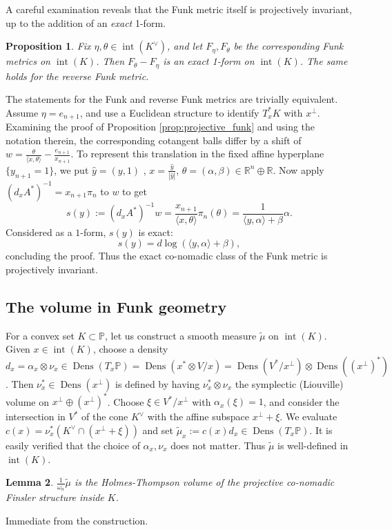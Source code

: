 \documentclass[reqno,10pt]{amsart}
\newcommand{\blue}{}
\newcounter{mp}
\newtheorem{Proposition}{Proposition}[section]
\newtheorem{Lemma}[Proposition]{Lemma}
\DeclareMathOperator{\inter}{int}
\DeclareMathOperator{\Dens}{Dens}
\newcommand{\R}{\mathbb{R}}
\newcommand{\PP}{\mathbb{P}}
\begin{document}
A careful examination reveals that the Funk metric itself is projectively invariant, up to the addition of an \emph{exact} 1-form.
\begin{Proposition}\label{prop:funk_exact}
	Fix $\eta, \theta\in \inter(K^\vee)$, and let $F_\eta, F_\theta$ be the corresponding Funk metrics on $\inter(K)$. Then $F_\theta-F_\eta$ is an exact 1-form on $\inter(K)$. The same holds for the reverse Funk metric.
\end{Proposition}
\proof
The statements for the Funk and reverse Funk metrics are trivially equivalent. Assume $\eta=e_{n+1}$, and use a Euclidean structure to identify $T_x^*K$ with $x^\perp$. Examining the proof of Proposition \ref{prop:projective_funk} and using the notation therein, the corresponding cotangent balls differ by a shift of $w=\frac{\theta}{\langle x,\theta\rangle}-\frac{e_{n+1}}{x_{n+1}}$. To represent this translation in the fixed affine hyperplane $\{y_{n+1}=1\}$,  we put $\hat y=(y,1)$ ,  $x=\frac{\hat y}{|\hat y|}$, $\theta=(\alpha, \beta)\in \R^n\oplus \R$. Now apply $(d_xA^*)^{-1}=x_{n+1}\pi_n$ to $w$ to get $$s(y):=(d_xA^*)^{-1}w=\frac{x_{n+1}} {\langle x,\theta\rangle}\pi_n(\theta)=\frac{1}{\langle y, \alpha\rangle +\beta}\alpha.$$
Considered as a $1$-form, $s(y)$ is exact: 
\[ s(y)=d\log(\langle y,\alpha\rangle+\beta),\]
concluding the proof. 
\endproof
{\blue  Thus the exact co-nomadic class of the Funk metric is projectively invariant.}

\subsection{The volume in Funk geometry}\label{sec:volume_funk}

For a convex set $K\subset \PP$, let us construct a smooth measure $\widetilde \mu$ on $\inter(K)$. Given $x\in \inter(K)$, choose a density $d_x=\alpha_x\otimes\nu_x\in \Dens(T_x\PP)=\Dens(x^*\otimes V/x)=\Dens(V^*/x^\perp)\otimes \Dens((x^\perp)^*)$. Then $\nu_x^*\in \Dens(x^\perp)$ is defined by having $\nu_x^*\otimes\nu_x$ the symplectic (Liouville) volume on $x^\perp\oplus (x^\perp)^*$.
Choose $\xi\in V^*/x^\perp$ with $\alpha_x(\xi)=1$, and consider the intersection in $V^*$ of the cone $K^\vee$ with the affine subspace $x^\perp+\xi$. We evaluate $c(x)=\nu_x^*(K^\vee\cap (x^\perp +\xi))$ and set $\widetilde\mu_x:=c(x)d_x\in\Dens(T_x\PP)$. It is easily verified that the choice of $\alpha_x,\nu_x$ does not matter. Thus $\widetilde\mu$ is well-defined in $\inter(K)$.

\begin{Lemma}\label{lem:holmes_thompson}
	$\frac{1}{\omega_n}\widetilde\mu$ is the Holmes-Thompson volume of the projective co-nomadic Finsler structure inside $K$.
\end{Lemma}
\proof
Immediate from the construction.
\endproof
\end{document}
